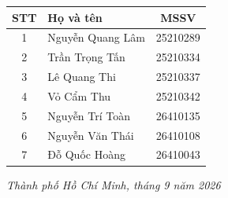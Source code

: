 \documentclass[14pt,a4paper]{extarticle}
\begin{document}
\begin{titlepage}
{\begin{tabular}{c l c}
\toprule
\textbf{STT} & \textbf{Họ và tên} & \textbf{MSSV} \\
\midrule
1 & Nguyễn Quang Lâm & 25210289 \\
2 & Trần Trọng Tấn   & 25210334 \\
3 & Lê Quang Thi     & 25210337 \\
4 & Vỏ Cẩm Thu       & 25210342 \\
5 & Nguyễn Trí Toàn  & 26410135 \\
6 & Nguyễn Văn Thái  & 26410108 \\
7 & Đỗ Quốc Hoàng    & 26410043 \\
\bottomrule
\end{tabular}\par}
\vfill
{\normalsize\itshape Thành phố Hồ Chí Minh, tháng 9 năm 2026\par}
\vspace*{0.45cm}
\end{titlepage}



\clearpage
{}








\end{document}
